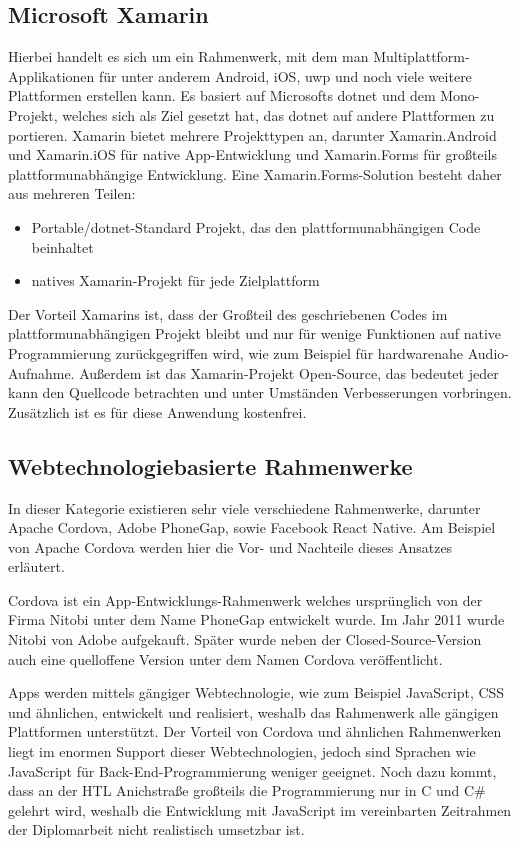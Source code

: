 \subsection{Microsoft Xamarin}
Hierbei handelt es sich um ein Rahmenwerk, mit dem man Multiplattform-Applikationen für unter anderem Android, iOS, \ac{uwp} und noch viele weitere Plattformen erstellen kann.
Es basiert auf Microsofts \ac{dotnet} und dem Mono-Projekt, welches sich als Ziel gesetzt hat, das \ac{dotnet} auf andere Plattformen zu portieren.
Xamarin bietet mehrere Projekttypen an, darunter Xamarin.Android und Xamarin.iOS für native App-Entwicklung und Xamarin.Forms für großteils plattformunabhängige Entwicklung.
Eine Xamarin.Forms-Solution besteht daher aus mehreren Teilen:
\begin{itemize}
    \item Portable/\ac{dotnet}-Standard Projekt, das den plattformunabhängigen Code beinhaltet
    \item natives Xamarin-Projekt für jede Zielplattform
\end{itemize}
Der Vorteil Xamarins ist, dass der Großteil des geschriebenen Codes im plattformunabhängigen Projekt bleibt und nur für wenige Funktionen auf native Programmierung zurückgegriffen wird, wie zum Beispiel für hardwarenahe Audio-Aufnahme.
Außerdem ist das Xamarin-Projekt Open-Source, das bedeutet jeder kann den Quellcode betrachten und unter Umständen Verbesserungen vorbringen.
Zusätzlich ist es für diese Anwendung kostenfrei.

\subsection{Webtechnologiebasierte Rahmenwerke}
In dieser Kategorie existieren sehr viele verschiedene Rahmenwerke, darunter Apache Cordova, Adobe PhoneGap, sowie Facebook React Native.
Am Beispiel von Apache Cordova werden hier die Vor- und Nachteile dieses Ansatzes erläutert.

Cordova ist ein App-Entwicklungs-Rahmenwerk welches ursprünglich von der Firma Nitobi unter dem Name PhoneGap entwickelt wurde.
Im Jahr 2011 wurde Nitobi von Adobe aufgekauft.
Später wurde neben der Closed-Source-Version auch eine quelloffene Version unter dem Namen Cordova veröffentlicht. \cite[vgl.][]{adobe-phonegap}\par

Apps werden mittels gängiger Webtechnologie, wie zum Beispiel JavaScript, CSS und ähnlichen, entwickelt und realisiert, weshalb das Rahmenwerk alle gängigen Plattformen unterstützt.
Der Vorteil von Cordova und ähnlichen Rahmenwerken liegt im enormen Support dieser Webtechnologien, jedoch sind Sprachen wie JavaScript für Back-End-Programmierung weniger geeignet.
Noch dazu kommt, dass an der HTL Anichstraße großteils die Programmierung nur in C und C\# gelehrt wird, weshalb die Entwicklung mit JavaScript im vereinbarten Zeitrahmen der Diplomarbeit nicht realistisch umsetzbar ist.

